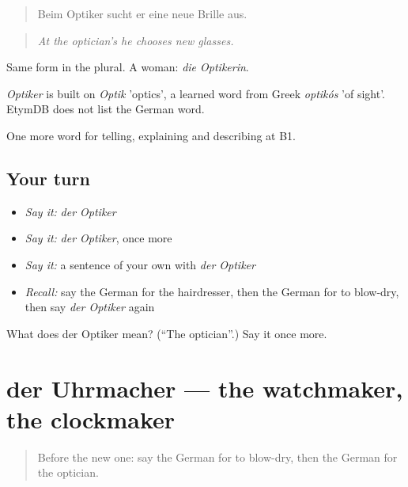\begin{quote}
Beim Optiker sucht er eine neue Brille aus.
\end{quote}

\begin{quote}
\emph{At the optician's he chooses new glasses.}
\end{quote}

Same form in the plural. A woman: \emph{die Optikerin}.

\begin{cousinweb}
\emph{Optiker} is built on \emph{Optik} 'optics', a learned word from Greek \emph{optikós} 'of sight'. EtymDB does not list the German word.
\end{cousinweb}

\begin{grammarlens}[title={What you've built}]
One more word for telling, explaining and describing at B1.
\end{grammarlens}

\subsection*{Your turn}
\begin{itemize}
\raggedright
  \item \emph{Say it:} \emph{der Optiker}
  \item \emph{Say it:} \emph{der Optiker}, once more
  \item \emph{Say it:} a sentence of your own with \emph{der Optiker}
  \item \emph{Recall:} say the German for the hairdresser, then the German for to blow-dry, then say \emph{der Optiker} again
\end{itemize}

\begin{tcolorbox}[breakable,colback=teal!4,colframe=teal!35!black,title={Before you move on}]
What does der Optiker mean? (\textquotedblleft{}The optician\textquotedblright{}.) Say it once more.
\end{tcolorbox}
\section[der Uhrmacher]{der Uhrmacher — the watchmaker, the clockmaker}

\label{lesson:GE-C447-uhrmacher}



\begin{quote}
Before the new one: say the German for to blow-dry, then the German for the optician.
\end{quote}

